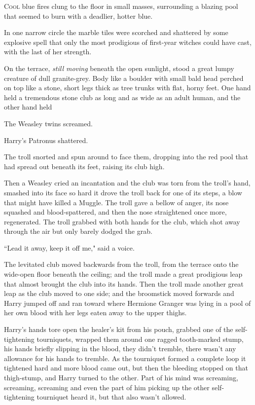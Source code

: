 
\lettrine{C}{ool} blue fires clung to the floor in small masses, surrounding a blazing pool that seemed to burn with a deadlier, hotter blue.

In one narrow circle the marble tiles were scorched and shattered by some explosive spell that only the most prodigious of first-year witches could have cast, with the last of her strength.

On the terrace, \emph{still moving} beneath the open sunlight, stood a great lumpy creature of dull granite-grey. Body like a boulder with small bald head perched on top like a stone, short legs thick as tree trunks with flat, horny feet. One hand held a tremendous stone club as long and as wide as an adult human, and the other hand held 

The Weasley twins screamed.

Harry's Patronus shattered.

The troll snorted and spun around to face them, dropping  into the red pool that had spread out beneath its feet, raising its club high.

Then a Weasley cried an incantation and the club was torn from the troll's hand, smashed into its face so hard it drove the troll back for one of its steps, a blow that might have killed a Muggle. The troll gave a bellow of anger, its nose squashed and blood-spattered, and then the nose straightened once more, regenerated. The troll grabbed with both hands for the club, which shot away through the air but only barely dodged the grab.

``Lead it away, keep it off me," said a voice.

The levitated club moved backwards from the troll, from the terrace onto the wide-open floor beneath the ceiling; and the troll made a great prodigious leap that almost brought the club into its hands. Then the troll made another great leap as the club moved to one side; and the broomstick moved forwards and Harry jumped off and ran toward where Hermione Granger was lying in a pool of her own blood with her legs eaten away to the upper thighs.

Harry's hands tore open the healer's kit from his pouch, grabbed one of the self-tightening tourniquets, wrapped them around one ragged tooth-marked stump, his hands briefly slipping in the blood, they didn't tremble, there wasn't any allowance for his hands to tremble. As the tourniquet formed a complete loop it tightened hard and more blood came out, but then the bleeding stopped on that thigh-stump, and Harry turned to the other. Part of his mind was screaming, screaming, screaming and even the part of him picking up the other self-tightening tourniquet heard it, but that also wasn't allowed.

